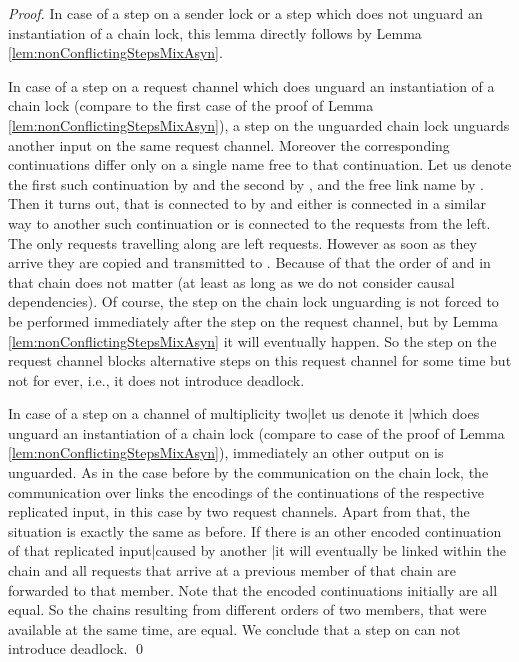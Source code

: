 \documentclass[]{llncs}
\begin{document}
\begin{proof}
	In case of a step on a sender lock or a step which does not unguard an instantiation of a chain lock, this lemma directly follows by Lemma \ref{lem:nonConflictingStepsMixAsyn}.
	
	In case of a step on a request channel which does unguard an instantiation of a chain lock (compare to the first case of the proof of Lemma \ref{lem:nonConflictingStepsMixAsyn}), a step on the unguarded chain lock unguards another input on the same request channel. Moreover the corresponding continuations differ only on a single name free to that continuation. Let us denote the first such continuation by  and the second by , and the free link name by . Then it turns out, that  is connected to  by  and either  is connected in a similar way to another such continuation or  is connected to the requests from the left. The only requests travelling along  are left requests. However as soon as they arrive  they are copied and transmitted to . Because of that the order of  and  in that chain does not matter (at least as long as we do not consider causal dependencies). Of course, the step on the chain lock unguarding  is not forced to be performed immediately after the step on the request channel, but by Lemma \ref{lem:nonConflictingStepsMixAsyn} it will eventually happen. So the step on the request channel blocks alternative steps on this request channel for some time but not for ever, i.e., it does not introduce deadlock.
	
	In case of a step on a channel of multiplicity two|let us denote it |which does unguard an instantiation of a chain lock (compare to case  of the proof of Lemma \ref{lem:nonConflictingStepsMixAsyn}), immediately an other output on  is unguarded. As in the case before by the communication on the chain lock, the communication over  links the encodings of the continuations of the respective replicated input, in this case by two request channels. Apart from that, the situation is exactly the same as before. If there is an other encoded continuation of that replicated input|caused by another \simulation\!\!|it will eventually be linked within the chain and all requests that arrive at a previous member of that chain are forwarded to that member. Note that the encoded continuations initially are all equal. So the chains resulting from different orders of two members, that were available at the same time, are equal. We conclude that a step on  can not introduce deadlock.
	\qed
\end{proof}
\end{document}

